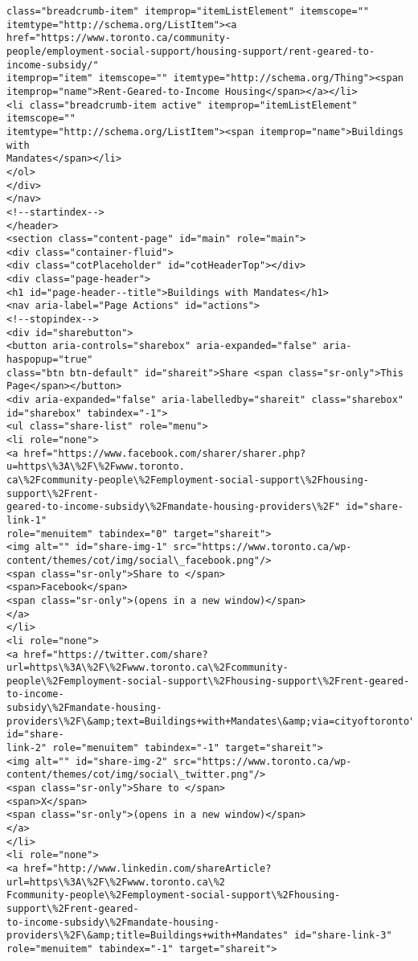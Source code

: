 \documentclass[11pt]{article}
\begin{document}
\begin{Verbatim}[commandchars=\\\{\}]
class="breadcrumb-item" itemprop="itemListElement" itemscope=""
itemtype="http://schema.org/ListItem"><a href="https://www.toronto.ca/community-
people/employment-social-support/housing-support/rent-geared-to-income-subsidy/"
itemprop="item" itemscope="" itemtype="http://schema.org/Thing"><span
itemprop="name">Rent-Geared-to-Income Housing</span></a></li>
<li class="breadcrumb-item active" itemprop="itemListElement" itemscope=""
itemtype="http://schema.org/ListItem"><span itemprop="name">Buildings with
Mandates</span></li>
</ol>
</div>
</nav>
<!--startindex-->
</header>
<section class="content-page" id="main" role="main">
<div class="container-fluid">
<div class="cotPlaceholder" id="cotHeaderTop"></div>
<div class="page-header">
<h1 id="page-header--title">Buildings with Mandates</h1>
<nav aria-label="Page Actions" id="actions">
<!--stopindex-->
<div id="sharebutton">
<button aria-controls="sharebox" aria-expanded="false" aria-haspopup="true"
class="btn btn-default" id="shareit">Share <span class="sr-only">This
Page</span></button>
<div aria-expanded="false" aria-labelledby="shareit" class="sharebox"
id="sharebox" tabindex="-1">
<ul class="share-list" role="menu">
<li role="none">
<a href="https://www.facebook.com/sharer/sharer.php?u=https\%3A\%2F\%2Fwww.toronto.
ca\%2Fcommunity-people\%2Femployment-social-support\%2Fhousing-support\%2Frent-
geared-to-income-subsidy\%2Fmandate-housing-providers\%2F" id="share-link-1"
role="menuitem" tabindex="0" target="shareit">
<img alt="" id="share-img-1" src="https://www.toronto.ca/wp-
content/themes/cot/img/social\_facebook.png"/>
<span class="sr-only">Share to </span>
<span>Facebook</span>
<span class="sr-only">(opens in a new window)</span>
</a>
</li>
<li role="none">
<a href="https://twitter.com/share?url=https\%3A\%2F\%2Fwww.toronto.ca\%2Fcommunity-
people\%2Femployment-social-support\%2Fhousing-support\%2Frent-geared-to-income-
subsidy\%2Fmandate-housing-
providers\%2F\&amp;text=Buildings+with+Mandates\&amp;via=cityoftoronto" id="share-
link-2" role="menuitem" tabindex="-1" target="shareit">
<img alt="" id="share-img-2" src="https://www.toronto.ca/wp-
content/themes/cot/img/social\_twitter.png"/>
<span class="sr-only">Share to </span>
<span>X</span>
<span class="sr-only">(opens in a new window)</span>
</a>
</li>
<li role="none">
<a href="http://www.linkedin.com/shareArticle?url=https\%3A\%2F\%2Fwww.toronto.ca\%2
Fcommunity-people\%2Femployment-social-support\%2Fhousing-support\%2Frent-geared-
to-income-subsidy\%2Fmandate-housing-
providers\%2F\&amp;title=Buildings+with+Mandates" id="share-link-3"
role="menuitem" tabindex="-1" target="shareit">

\end{Verbatim}
\end{document}

